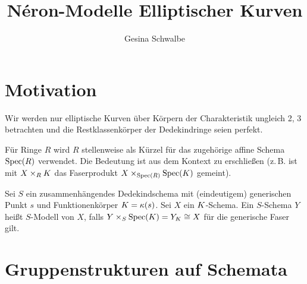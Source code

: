 \documentclass[german]{scrreprt}
\title{
  Néron-Modelle Elliptischer Kurven
}
\author{Gesina Schwalbe}
\begin{document}
\maketitle
\tableofcontents

\chapter{Motivation}
Wir werden nur elliptische Kurven über Körpern der Charakteristik
ungleich 2, 3 betrachten und die Restklassenkörper der Dedekindringe
seien perfekt.

Für Ringe $R$ wird $R$ stellenweise als Kürzel für das zugehörige
affine Schema $\operatorname{Spec}(R)$ verwendet. Die Bedeutung ist aus dem Kontext
zu erschließen (z.\,B. ist mit $X\times_R K$ das Faserprodukt
$X\times_{\operatorname{Spec}(R)}\operatorname{Spec}(K)$ gemeint).

\begin{Definition}[$S$-Modell]
  Sei $S$ ein zusammenhängendes Dedekindschema mit (eindeutigem)
  generischen Punkt $s$ und Funktionenkörper $K=\kappa(s)$.
  Sei $X$ ein $K$-Schema.
  Ein $S$-Schema $Y$ heißt $S$-Modell von $X$, falls
  $Y\times_S\operatorname{Spec}(K)=Y_K\cong X$ für die generische Faser gilt.
\end{Definition}


\chapter{Gruppenstrukturen auf Schemata}
\end{document}
